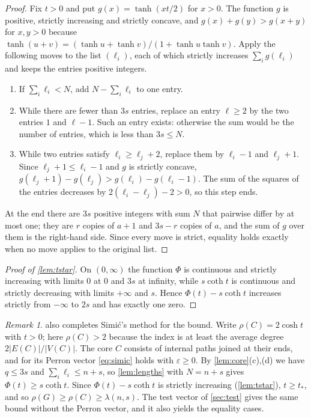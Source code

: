 \documentclass[11pt]{article}
\theoremstyle{definition}
\theoremstyle{remark}
\newtheorem{remark}[theorem]{Remark}
\begin{document}
\begin{proof}
Fix $t>0$ and put $g(x)=\tanh(xt/2)$ for $x>0$. The function $g$ is positive, strictly increasing and strictly concave,
and $g(x)+g(y)>g(x+y)$ for $x,y>0$ because $\tanh(u+v)=(\tanh u+\tanh v)/(1+\tanh u\tanh v)$. Apply the following moves
to the list $(\ell_i)$, each of which strictly increases $\sum_ig(\ell_i)$ and keeps the entries positive integers.
\begin{enumerate}[label=(\arabic*)]
\item If $\sum_i\ell_i<N$, add $N-\sum_i\ell_i$ to one entry.
\item While there are fewer than $3s$ entries, replace an entry $\ell\ge2$ by the two entries $1$ and $\ell-1$. Such an
entry exists: otherwise the sum would be the number of entries, which is less than $3s\le N$.
\item While two entries satisfy $\ell_i\ge\ell_j+2$, replace them by $\ell_i-1$ and $\ell_j+1$. Since
$\ell_j+1\le\ell_i-1$ and $g$ is strictly concave, $g(\ell_j+1)-g(\ell_j)>g(\ell_i)-g(\ell_i-1)$. The sum of the squares
of the entries decreases by $2(\ell_i-\ell_j)-2>0$, so this step ends.
\end{enumerate}
At the end there are $3s$ positive integers with sum $N$ that pairwise differ by at most one; they are $r$ copies of
$a+1$ and $3s-r$ copies of $a$, and the sum of $g$ over them is the right-hand side. Since every move is strict,
equality holds exactly when no move applies to the original list.
\end{proof}

\begin{proof}[Proof of \cref{lem:tstar}]
On $(0,\infty)$ the function $\Phi$ is continuous and strictly increasing with limits $0$ at $0$ and $3s$ at
infinity, while $s\coth t$ is continuous and strictly decreasing with limits $+\infty$ and $s$. Hence
$\Phi(t)-s\coth t$ increases strictly from $-\infty$ to $2s$ and has exactly one zero.
\end{proof}

\begin{remark}\label{rem:simic}
 also completes Simi\'c's method for the bound. Write $\rho(C)=2\cosh t$ with $t>0$; here $\rho(C)>2$
because the index is at least the average degree $2|E(C)|/|V(C)|$. The core $C$ consists of internal paths joined at
their ends, and for its Perron vector \eqref{eq:simic} holds with $\varepsilon\ge0$. By \cref{lem:core}(c),(d) we have
$q\le3s$ and $\sum_i\ell_i\le n+s$, so \cref{lem:lengths} with $N=n+s$ gives $\Phi(t)\ge s\coth t$. Since
$\Phi(t)-s\coth t$ is strictly increasing (\cref{lem:tstar}), $t\ge t_*$, and so $\rho(G)\ge\rho(C)\ge\lambda(n,s)$.
The test vector of \cref{sec:test} gives the same bound without the Perron vector, and it also yields the equality
cases.
\end{remark}
\end{document}
